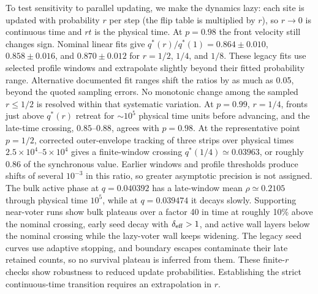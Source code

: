 \documentclass[pre,twocolumn,superscriptaddress,showpacs,floatfix]{revtex4-2}
\newcommand{\qs}{q^{*}}
\begin{document}
To test sensitivity to parallel updating, we make the dynamics lazy: each site
is updated with probability $r$ per step (the flip table is multiplied
by $r$), so $r\to 0$ is continuous time and $rt$ is the physical time. At $p = 0.98$ the front
velocity still changes sign. Nominal linear fits give
$\qs(r)/\qs(1) = 0.864\pm0.010$, $0.858\pm0.016$,
and $0.870\pm0.012$ for $r = 1/2$, $1/4$, and $1/8$.
These legacy fits use selected profile windows and extrapolate slightly
beyond their fitted probability range. Alternative documented fit ranges
shift the ratios by as much as 0.05, beyond the quoted sampling errors.
No monotonic change among the sampled $r\le1/2$ is resolved within that
systematic variation. At
$p = 0.99$, $r = 1/4$, fronts just above $\qs(r)$ retreat for $\sim 10^5$ physical time units
before advancing, and the late-time crossing, $0.85$--$0.88$, agrees with $p = 0.98$. At the
representative point $p=1/2$, corrected outer-envelope tracking of three
strips over physical times $2.5\times10^4$--$5\times10^4$ gives a
finite-window crossing $q^*(1/4)\simeq0.03963$, or roughly 0.86 of the
synchronous value. Earlier windows and profile thresholds produce shifts
of several $10^{-3}$ in this ratio, so greater asymptotic precision is
not assigned. The bulk active phase at $q=0.040392$ has a late-window mean
$\rho\simeq0.2105$ through physical time $10^5$, while at $q=0.039474$
it decays slowly. Supporting near-voter runs show bulk plateaus over a
factor 40 in time at roughly 10\% above the nominal crossing, early seed
decay with $\delta_{\rm eff}>1$, and active wall layers below the nominal
crossing while the lazy-voter wall keeps widening. The legacy seed curves
use adaptive stopping, and boundary escapes contaminate their late retained
counts, so no survival plateau is inferred from them.
These finite-$r$ checks show robustness to reduced update probabilities.
Establishing the strict continuous-time transition requires an extrapolation
in $r$.
\end{document}
